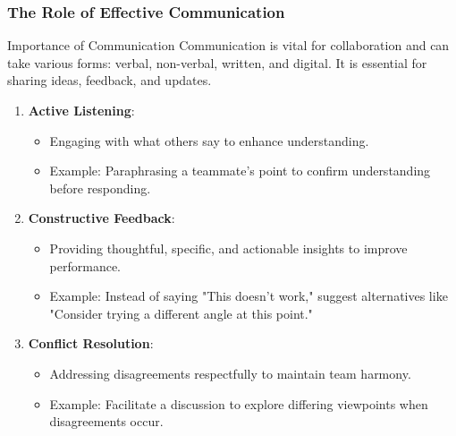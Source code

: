 \documentclass[aspectratio=169]{beamer}
\begin{document}
\begin{frame}[fragile]
    \frametitle{The Role of Effective Communication}
    \begin{block}{Importance of Communication}
        Communication is vital for collaboration and can take various forms: verbal, non-verbal, written, and digital. It is essential for sharing ideas, feedback, and updates.
    \end{block}

    \begin{enumerate}
        \item \textbf{Active Listening}:
            \begin{itemize}
                \item Engaging with what others say to enhance understanding.
                \item Example: Paraphrasing a teammate's point to confirm understanding before responding.
            \end{itemize}
        \item \textbf{Constructive Feedback}:
            \begin{itemize}
                \item Providing thoughtful, specific, and actionable insights to improve performance.
                \item Example: Instead of saying "This doesn't work," suggest alternatives like "Consider trying a different angle at this point."
            \end{itemize}
        \item \textbf{Conflict Resolution}:
            \begin{itemize}
                \item Addressing disagreements respectfully to maintain team harmony.
                \item Example: Facilitate a discussion to explore differing viewpoints when disagreements occur.
            \end{itemize}
    \end{enumerate}
\end{frame}
\end{document}
